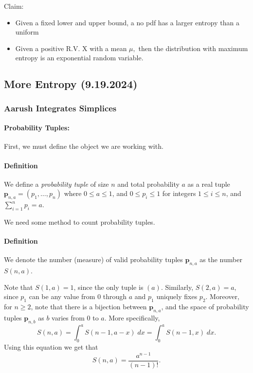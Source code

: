 \documentclass[12pt]{article}
\begin{document}
Claim:
\begin{itemize}
\item Given a fixed lower and upper bound, a no pdf has a larger entropy than a uniform
\item Given a positive R.V. X with a mean $\mu,$ then the distribution with maximum entropy is an exponential random variable.
\end{itemize}



\subsection{More Entropy (9.19.2024)}
\subsubsection{Aarush Integrates Simplices}
\paragraph{Probability Tuples:}
First, we must define the object we are working with.
\paragraph{Definition}
    We define a \emph{probability tuple} of size $n$ and total probability $a$ as a real tuple $\boldsymbol{p}_{n,a}=(p_1,\ldots,p_n)$ where $0\leq a\leq 1$, and $0\leq p_i\leq 1$ for integers $1\leq i\leq n$, and $\sum_{i=1}^n p_i=a$. 

We need some method to count probability tuples.

\paragraph{Definition}
    We denote the number (measure) of valid probability tuples $\boldsymbol{p}_{n,a}$ as the number $S(n,a)$.

Note that $S(1,a)=1$, since the only tuple is $(a)$. Similarly, $S(2,a)=a$, since $p_1$ can be any value from $0$ through $a$ and $p_1$ uniquely fixes $p_2$. Moreover, for $n\geq 2$, note that there is a bijection between $\boldsymbol{p}_{n,a}$, and the space of probability tuples $\boldsymbol{p}_{n,b}$ as $b$ varies from $0$ to $a$. More specifically,
\begin{equation*}
    S(n,a)=\int_{0}^a S(n-1,a-x)\;dx=\int_{0}^a S(n-1,x)\;dx.
\end{equation*}
Using this equation we get that
\begin{equation*}
    S({n,a})=\frac{a^{n-1}}{(n-1)!}.
\end{equation*}
\end{document}
